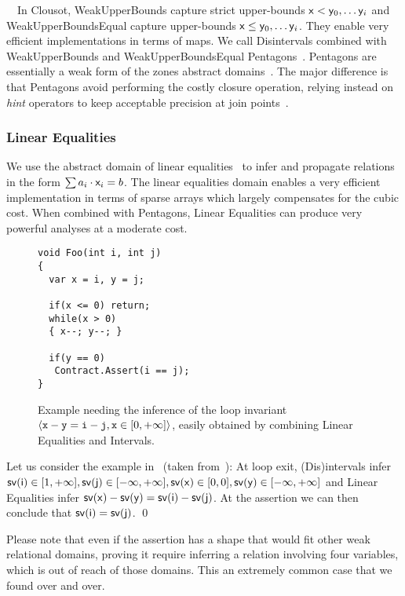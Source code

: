 \documentclass{llncs}
\begin{document}
\noindent
\ \ In Clousot, WeakUpperBounds capture strict upper-bounds $\mathsf{x} < \mathsf{y}_0, \dots \mathsf{y}_i$ and WeakUpperBoundsEqual capture upper-bounds $\mathsf{x} \leq \mathsf{y}_0, \dots \mathsf{y}_i$.
They enable very efficient implementations in terms of maps.
We call Disintervals combined with WeakUpperBounds and WeakUpperBoundsEqual Pentagons~\cite{LogozzoFahndrich08-2}.
Pentagons are essentially a weak form of the zones abstract domains~\cite{Mine02}.
The major difference is that Pentagons  avoid performing the costly closure operation, relying instead on \emph{hint} operators to keep acceptable precision at join points~\cite{LavironLogozzo09-1}. 

\subsubsection{Linear Equalities}
We use the abstract domain of linear equalities~\cite{Karr76} to infer and propagate relations in the form $\sum a_i \cdot \mathsf{x}_i = b$.
The linear equalities domain enables a very efficient implementation in terms of sparse arrays which largely compensates for the cubic cost. 
When combined with Pentagons, Linear Equalities can produce very powerful analyses at a moderate cost.

\begin{wrapfigure}{l}{0pt}
\begin{lstlisting}
void Foo(int i, int j)
{
  var x = i, y = j;

  if(x <= 0) return;
  while(x > 0)
  { x--; y--; }
  
  if(y == 0)
   Contract.Assert(i == j);
}
\end{lstlisting}
\caption{Example needing the inference of the loop invariant $\langle \mathtt{x} -\mathtt{y} = \mathtt{i} -\mathtt{j}, \mathtt{x} \in [0, +\infty] \rangle$, easily obtained by combining Linear Equalities and Intervals.}
\label{fig:foo}
\end{wrapfigure}

\begin{example}
Let us consider the example in~ (taken from~\cite{Sankaranarayanan07}):
At loop exit, (Dis)intervals infer $\mathsf{sv(i)} \in [1, +\infty], \mathsf{sv(j)} \in [-\infty, +\infty], \mathsf{sv(x)} \in [0,0], \mathsf{sv(y)} \in [-\infty, +\infty]$ and 
Linear Equalities infer $\mathsf{sv(x)} - \mathsf{sv(y)} = \mathsf{sv(i)} - \mathsf{sv(j)}$.
At the assertion  we can then conclude that $\mathsf{sv(i)} = \mathsf{sv(j)}$. \qed
\end{example}

Please note that even if the assertion has a shape that would fit other weak relational domains, proving it require inferring a relation involving four variables, which is out of reach of those domains.
This an extremely common case that we found over and over.
\end{document}
